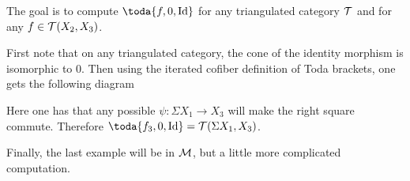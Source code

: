 \begin{example}
	The goal is to compute \( \toda{f, 0, \Id} \) for any triangulated category \( {\mathcal{T}} \) and for any \( f \in {\mathcal{T}}(X_2, X_3) \).

	First note that on any triangulated category, the cone of the identity morphism is isomorphic to \( 0 \). Then using the iterated cofiber definition of Toda brackets, one gets the following diagram
	\begin{center}
	\end{center}

	Here one has that any possible \( \psi: \Sigma X_1 \to X_3 \) will make the right square commute. Therefore \( \toda{f_3, 0, \Id} = \Tc(\Sigma X_1, X_3) \).
\end{example}

Finally, the last example will be in \( {\mathcal{M}} \), but a little more complicated computation.

